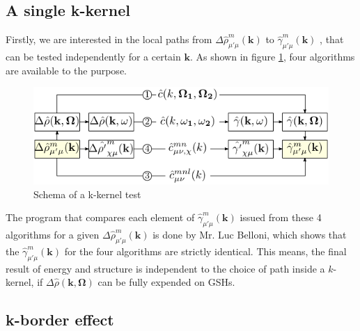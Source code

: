 \subsection{A single k-kernel\label{subsec:A-single-k-kernel}}

Firstly, we are interested in the local paths from $\Delta\hat{\rho}_{\mu'\mu}^{m}(\mathbf{k})$
to $\hat{\gamma}_{\mu'\mu}^{m}(\mathbf{k})$ , that can be tested
independently for a certain $\mathbf{k}$. As shown in figure \ref{fig:k-kernel},
four algorithms are available to the purpose.

\begin{figure}[h]
\begin{centering}
\includegraphics{_figure/algorithms_q}
\par\end{centering}
\caption{Schema of a k-kernel test \label{fig:k-kernel} }
\end{figure}

The program that compares each element of $\hat{\gamma}_{\mu'\mu}^{m}(\mathbf{k})$
issued from these 4 algorithms for a given $\Delta\hat{\rho}_{\mu'\mu}^{m}(\mathbf{k})$
is done by Mr. Luc Belloni, which shows that the $\hat{\gamma}_{\mu'\mu}^{m}(\mathbf{k})$
for the four algorithms are strictly identical. This means, the final
result of energy and structure is independent to the choice of path
inside a $k$-kernel, if $\Delta\hat{\rho}(\mathbf{k},\mathbf{\Omega})$
can be fully expended on \acs{GSH}s.

\subsection{k-border effect\label{subsec:k-border-effect}}

